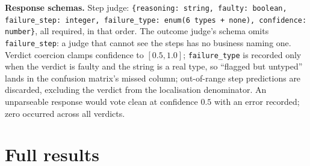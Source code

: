 \textbf{Response schemas.} Step judge:
\texttt{\{reasoning: string, faulty: boolean, failure\_step: integer, failure\_type:
enum(6 types + none), confidence: number\}}, all required, in that order. The outcome judge's
schema omits \texttt{failure\_step}: a judge that cannot see the steps has no business naming
one. Verdict coercion clamps confidence to $[0.5, 1.0]$; \texttt{failure\_type} is recorded
only when the verdict is faulty and the string is a real type, so ``flagged but untyped''
lands in the confusion matrix's missed column; out-of-range step predictions are discarded,
excluding the verdict from the localisation denominator. An unparseable response would vote
clean at confidence $0.5$ with an error recorded; zero occurred across all \tjNVerdicts{}
verdicts.

\section{Full results}
\label{app:full}

